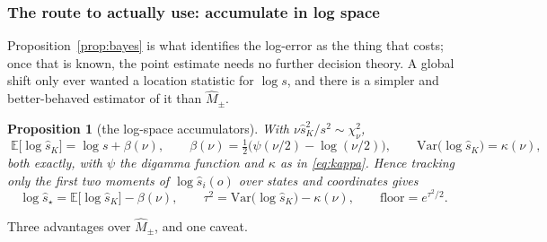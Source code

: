 \documentclass[11pt]{article}
\newtheorem{proposition}{Proposition}
\theoremstyle{definition}
\newcommand{\Var}{\mathrm{Var}}
\newcommand{\E}{\mathbb{E}}
\begin{document}
\subsubsection*{The route to actually use: accumulate in log space}

Proposition~\ref{prop:bayes} is what identifies the log-error as the thing that
costs; once that is known, the point estimate needs no further decision theory.
A global shift only ever wanted a location statistic for $\log s$, and there is a
simpler and better-behaved estimator of it than $\widehat M_\pm$.

\begin{proposition}[the log-space accumulators]
\label{prop:logroute}
With $\nu\hat s_K^2/s^2\sim\chi^2_\nu$,
\begin{equation}
  \boxed{\;
  \E\big[\log\hat s_K\big]=\log s+\beta(\nu),
  \qquad
  \beta(\nu)=\tfrac12\big(\psi(\nu/2)-\log(\nu/2)\big),
  \qquad
  \Var\big(\log\hat s_K\big)=\kappa(\nu),
  \;}
  \label{eq:logroute}
\end{equation}
both exactly, with $\psi$ the digamma function and $\kappa$ as in
\eqref{eq:kappa}. Hence tracking only the first two moments of
$\log\hat s_i(o)$ over states and coordinates gives
\begin{equation}
  \log\hat s_\star=\E\big[\log\hat s_K\big]-\beta(\nu),
  \qquad
  \tau^2=\Var\big(\log\hat s_K\big)-\kappa(\nu),
  \qquad
  \text{floor}=e^{\tau^2/2}.
  \label{eq:logaccum}
\end{equation}
\end{proposition}

Three advantages over $\widehat M_\pm$, and one caveat.
\end{document}
